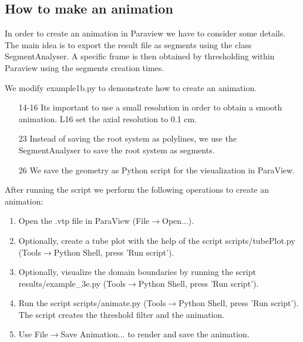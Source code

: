 \documentclass[a4paper]{article}
\begin{document}
\subsection{How to make an animation}

In order to create an animation in Paraview we have to consider some details. 
The main idea is to export the result file as segments using the class SegmentAnalyser. 
A specific frame is then obtained by thresholding within Paraview using the segments creation times. 

We modify example1b.py to demonstrate how to create an animation.



\begin{itemize}

\item[14-16] Its important to use a small resolution in order to obtain a smooth animation. L16 set the axial resolution to 0.1 cm. 

\item[23] Instead of saving the root system as polylines, we use the SegmentAnalyser to save the root system as segments.

\item[26] We save the geometry as Python script for the visualization in ParaView.

\end{itemize}

After running the script we perform the following operations to create an animation:
\begin{enumerate}
 \item Open the .vtp file in ParaView (File$\rightarrow$Open...).
 \item Optionally, create a tube plot with the help of the script scripts/tubePlot.py (Tools$\rightarrow$Python Shell, press 'Run script').
 \item Optionally, visualize the domain boundaries by running the script results/example\_3e.py (Tools$\rightarrow$Python Shell, press 'Run script').
 \item Run the script scripts/animate.py (Tools$\rightarrow$Python Shell, press 'Run script'). The script creates the threshold filter and the animation. 
 \item Use File$\rightarrow$Save Animation... to render and save the animation.
\end{enumerate}
\end{document}
